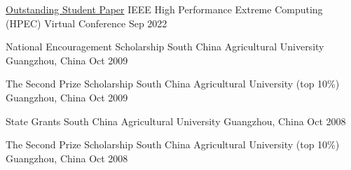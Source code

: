 



\begin{cvhonors}

  \cvhonor
    {\href{https://ieee-hpec.org/index.php/ieee-hpec-2022-prelim-agenda/}{Outstanding Student Paper}} %
    {IEEE High Performance Extreme Computing (HPEC)} %
    {Virtual Conference} %
    {Sep 2022} %

  \cvhonor
    {National Encouragement Scholarship} %
    {South China Agricultural University} %
    {Guangzhou, China} %
    {Oct 2009} %

  \cvhonor
    {The Second Prize Scholarship} %
    {South China Agricultural University (top 10\%)} %
    {Guangzhou, China} %
    {Oct 2009} %

  \cvhonor
    {State Grants} %
    {South China Agricultural University} %
    {Guangzhou, China} %
    {Oct 2008} %

  \cvhonor
    {The Second Prize Scholarship} %
    {South China Agricultural University (top 10\%)} %
    {Guangzhou, China} %
    {Oct 2008} %

\end{cvhonors}
